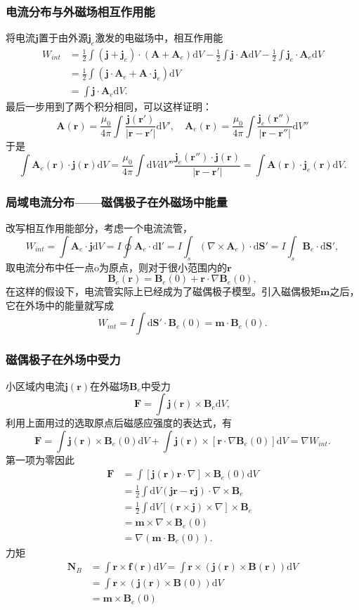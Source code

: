 \documentclass[UTF8]{ctexbook}
\renewcommand{\d}{\mathrm{d}}
\renewcommand{\b}{\boldsymbol}
\numberwithin{equation}{chapter}
\begin{document}
	\subsubsection{电流分布与外磁场相互作用能}
	将电流$\b{j}$置于由外源$\b{j}_e$激发的电磁场中，相互作用能
	\begin{align*}
		W_{int}&=\frac{1}{2}\int (\b{j}+\b{j}_e)\cdot(\b{A}+\b{A}_e)\d V - \frac{1}{2}\int\b{j}\cdot\b{A}\d V - \frac{1}{2}\int \b{j}_e\cdot\b{A}_e\d V \\
		&=\frac{1}{2}\int (\b{j}\cdot\b{A}_e+\b{A}\cdot\b{j}_e)\d V \\
		&=\int \b{j}\cdot\b{A}_e \d V.
	\end{align*}
	最后一步用到了两个积分相同，可以这样证明：
	\[\b{A}(\b{r})=\frac{\mu_0}{4\pi}\int \frac{\b{j}(\b{r}')}{|\b{r}-\b{r}'|}\d V',\quad \b{A}_e(\b{r})=\frac{\mu_0}{4\pi}\int \frac{\b{j}_e(\b{r}'')}{|\b{r}-\b{r}''|}\d V''\]
	于是
	\[\int \b{A}_e(\b{r})\cdot\b{j}(\b{r})\d V=\frac{\mu_0}{4\pi}\int \d V\d V''\frac{\b{j}_e(\b{r}'')\cdot\b{j}(\b{r})}{|\b{r}-\b{r}'|}=\int \b{A}(\b{r})\cdot\b{j}_e(\b{r})\d V.\]
	
	\subsubsection{局域电流分布——磁偶极子在外磁场中能量}
	改写相互作用能部分，考虑一个电流流管，
	\[W_{int}=\int \b{A}_e\cdot\b{j}\d V = I\oint \b{A}_e\cdot\d \b{l}'= I \int_s(\nabla\times\b{A}_e)\cdot\d \b{S}' = I\int_s\b{B}_e\cdot\d \b{S}',\]
	取电流分布中任一点o为原点，则对于很小范围内的$\b{r}$
	\[\b{B}_e(\b{r})=\b{B}_e(0)+\b{r}\cdot\nabla\b{B}_e(0),\]
	在这样的假设下，电流管实际上已经成为了磁偶极子模型。引入磁偶极矩$\b{m}$之后，它在外场中的能量就写成
	\[W_{int}=I\int\d \b{S}'\cdot\b{B}_e(0)=\b{m}\cdot\b{B}_e(0).\]
	
	\subsubsection{磁偶极子在外场中受力}
	小区域内电流$\b{j}(\b{r})$在外磁场$\b{B}_e$中受力
	\[\b{F}=\int \b{j}(\b{r})\times\b{B}_e\d V,\]
	利用上面用过的选取原点后磁感应强度的表达式，有
	\[\b{F}=\int \b{j}(\b{r})\times\b{B}_e(0)\d V + \int\b{j}(\b{r})\times\left[\b{r}\cdot\nabla\b{B}_e(0)\right]\d V=\nabla W_{int}.\]
	第一项为零因此
	\begin{align*}
		\b{F}&=\int \left[\b{j}(\b{r})\b{r}\cdot\nabla\right]\times\b{B}_e(0)\d V \\
		&=\frac{1}{2}\int \d V(\b{j}\b{r}-\b{r}\b{j})\cdot\nabla\times\b{B}_e \\
		&=\frac{1}{2}\int \d V\left[(\b{r}\times\b{j})\times\nabla\right]\times\b{B}_e \\
		&=\b{m}\times\nabla\times\b{B}_e(0) \\
		&=\nabla(\b{m}\cdot\b{B}_e(0)).
	\end{align*}
	力矩
	\begin{align*}
		\b{N}_B&=\int \b{r}\times\b{f}(\b{r})\d V = \int\b{r}\times(\b{j}(\b{r})\times\b{B}(\b{r}))\d V\\ 
		&=\int \b{r}\times(\b{j}(\b{r})\times\b{B}(0))\d V \\
		&= \b{m}\times\b{B}_e(0)
	\end{align*}
	
\end{document}
